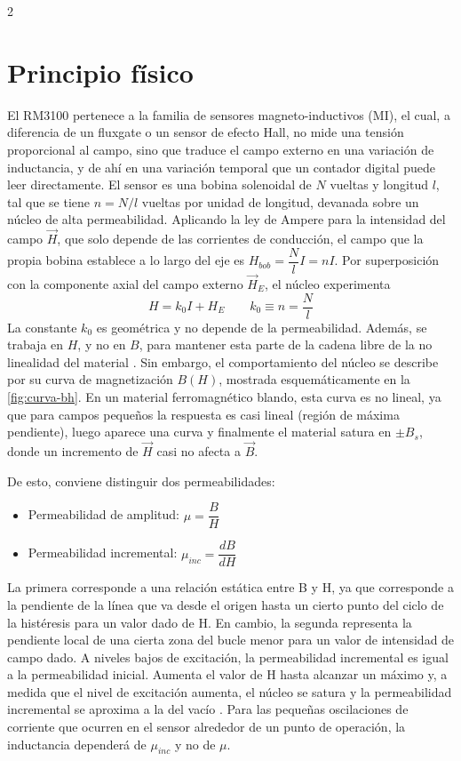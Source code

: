 \documentclass[11pt,letterpaper]{article}
\begin{document}
\begin{multicols*}{2}
\section{Principio físico}
El RM3100 pertenece a la familia de sensores magneto-inductivos (MI), el cual, a diferencia de un fluxgate o un sensor de efecto Hall, no mide una tensión proporcional al campo, sino que traduce el campo externo en una variación de inductancia, y de ahí en una variación temporal que un contador digital puede leer directamente. 
El sensor es una bobina solenoidal de $N$ vueltas y longitud $l$, tal que se tiene $n = N/l$ vueltas por unidad de longitud, devanada sobre un núcleo de alta permeabilidad. Aplicando la ley de Ampere para la intensidad del campo $\vec{H}$, que solo depende de las corrientes de conducción, el campo que la propia bobina establece a lo largo del eje es $H_{bob} = \dfrac{N}{l}I = n I$. Por superposición con la componente axial del campo externo $\vec{H}_E$, el núcleo experimenta
\begin{equation}
    H = k_0I + H_E \qquad k_0\equiv n = \dfrac{N}{l}
    \label{eq:1}
\end{equation}
La constante $k_0$ es geométrica y no depende de la permeabilidad. Además, se trabaja en $H$, y no en $B$, para mantener esta parte de la cadena libre de la no linealidad del material \citep{leuzinger2010}.
Sin embargo, el comportamiento del núcleo se describe por su curva de magnetización $B(H)$, mostrada esquemáticamente en la \cref{fig:curva-bh}. En un material ferromagnético blando, esta curva es no lineal, ya que para campos pequeños la respuesta es casi lineal (región de máxima pendiente), luego aparece una curva y finalmente el material satura en $\pm B_s$, donde un incremento de $\vec{H}$ casi no afecta a $\vec{B}$.

De esto, conviene distinguir dos permeabilidades:
\begin{itemize}
    \item Permeabilidad de amplitud: $\mu = \dfrac{B}{H}$
    \item Permeabilidad incremental: $\mu_{inc} = \dfrac{dB}{dH}$
\end{itemize}

La primera corresponde a una relación estática entre B y H, ya que corresponde a la pendiente de la línea que va desde el origen hasta un cierto punto del ciclo de la histéresis para un valor dado de H. En cambio, la segunda representa la pendiente local de una cierta zona del bucle menor para un valor de intensidad de campo dado. A niveles bajos de excitación, la permeabilidad incremental es igual a la permeabilidad inicial. Aumenta el valor de H hasta alcanzar un máximo y, a medida que el nivel de excitación aumenta, el núcleo se satura y la permeabilidad incremental se aproxima a la del vacío \citep{permeability}. Para las pequeñas oscilaciones de corriente que ocurren en el sensor alrededor de un punto de operación, la inductancia dependerá de $\mu_{inc}$ y no de $\mu$.


\end{multicols*}
\end{document}

